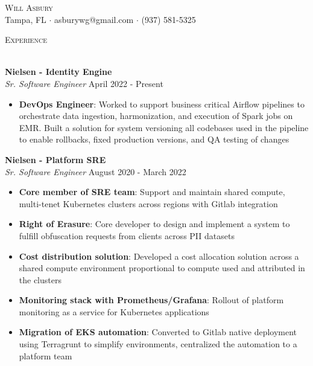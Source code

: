 \documentclass[a4paper]{article}
\newcommand{\lineunder} {
    \vspace*{-8pt} \\
    \hspace*{-18pt} \hrulefill \\
}
\newcommand{\header} [1] {
    {\hspace*{-18pt}\vspace*{6pt} \textsc{#1}}
    \vspace*{-6pt} \lineunder
}
\begin{document}
\vspace*{-40pt}

\vspace*{-10pt}
\begin{center}
	{\Huge \scshape {Will Asbury}}\\
	Tampa, FL $\cdot$ asburywg@gmail.com $\cdot$ (937) 581-5325\\
\end{center}

\header{Experience}
\vspace{1mm}

\textbf{Nielsen - Identity Engine}\\
\textit{Sr. Software Engineer} \hfill April 2022 - Present\\
\vspace{-1mm}
\begin{itemize} \itemsep 1pt
    \item \textbf{DevOps Engineer}: Worked to support business critical Airflow pipelines to orchestrate data ingestion, harmonization, and execution of Spark jobs on EMR. Built a solution for system versioning all codebases used in the pipeline to enable rollbacks, fixed production versions, and QA testing of changes
\end{itemize}

\textbf{Nielsen - Platform SRE}\\
\textit{Sr. Software Engineer} \hfill August 2020 - March 2022\\
\vspace{-1mm}
\begin{itemize} \itemsep 1pt
    \item \textbf{Core member of SRE team}: Support and maintain shared compute, multi-tenet Kubernetes clusters across regions with Gitlab integration
    \item \textbf{Right of Erasure}: Core developer to design and implement a system to fulfill obfuscation requests from clients across PII datasets
    \item \textbf{Cost distribution solution}: Developed a cost allocation solution across a shared compute environment proportional to compute used and attributed in the clusters
    \item \textbf{Monitoring stack with Prometheus/Grafana}: Rollout of platform monitoring as a service for Kubernetes applications
    \item \textbf{Migration of EKS automation}: Converted to Gitlab native deployment using Terragrunt to simplify environments, centralized the automation to a platform team
\end{itemize}
\end{document}
